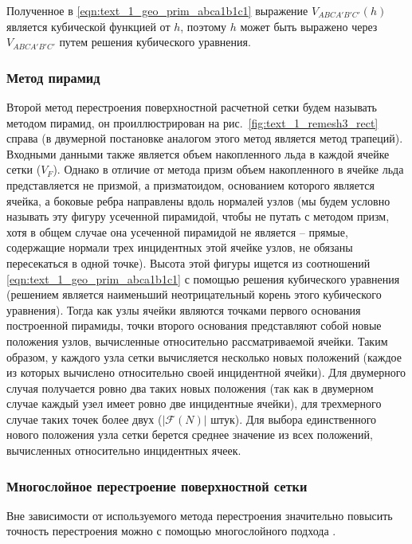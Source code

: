 Полученное в \eqref{eqn:text_1_geo_prim_abca1b1c1} выражение $V_{ABCA'B'C'}(h)$ является кубической функцией от $h$, поэтому $h$ может быть выражено через $V_{ABCA'B'C'}$ путем решения кубического уравнения.

\subsubsection{Метод пирамид}

Второй метод перестроения поверхностной расчетной сетки будем называть методом пирамид, он проиллюстрирован на рис.~\ref{fig:text_1_remesh3_rect} справа (в двумерной постановке аналогом этого метод является метод трапеций).
Входными данными также является объем накопленного льда в каждой ячейке сетки ($V_F$).
Однако в отличие от метода призм объем накопленного в ячейке льда представляется не призмой, а призматоидом, основанием которого является ячейка, а боковые ребра направлены вдоль нормалей узлов (мы будем условно называть эту фигуру усеченной пирамидой, чтобы не путать с методом призм, хотя в общем случае она усеченной пирамидой не является -- прямые, содержащие нормали трех инцидентных этой ячейке узлов, не обязаны пересекаться в одной точке).
Высота этой фигуры ищется из соотношений \eqref{eqn:text_1_geo_prim_abca1b1c1} с помощью решения кубического уравнения (решением является наименьший неотрицательный корень этого кубического уравнения).
Тогда как узлы ячейки являются точками первого основания построенной пирамиды, точки второго основания представляют собой новые положения узлов, вычисленные относительно рассматриваемой ячейки.
Таким образом, у каждого узла сетки вычисляется несколько новых положений (каждое из которых вычислено относительно своей инцидентной ячейки).
Для двумерного случая получается ровно два таких новых положения (так как в двумерном случае каждый узел имеет ровно две инцидентные ячейки), для трехмерного случае таких точек более двух ($|\mathscr{F}(N)|$ штук).
Для выбора единственного нового положения узла сетки берется среднее значение из всех положений, вычисленных относительно инцидентных ячеек.

\subsubsection{Многослойное перестроение поверхностной сетки}

Вне зависимости от используемого метода перестроения значительно повысить точность перестроения можно с помощью многослойного подхода \cite{BourgaultCote2017}.

